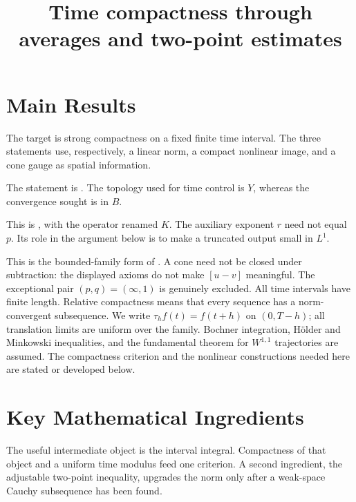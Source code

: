 \documentclass[12pt,reqno]{amsart}
\title{Time compactness through averages and two-point estimates}
\date{}
\begin{document}
\maketitle
\section{Main Results}
The target is strong compactness on a fixed finite time interval. The three statements use, respectively, a linear norm, a compact nonlinear image, and a cone gauge as spatial information.
\begin{theorem}[Simon]\label{thm:simon}

\end{theorem}
The statement is \cite[Theorem 5, pp.~84--85]{S-simon}. The topology used for time control is $Y$, whereas the convergence sought is in $B$.

\begin{theorem}[Maitre]\label{thm:maitre}

\end{theorem}
This is \cite[Theorem 2.1, p.~1726]{S-maitre}, with the operator renamed $K$. The auxiliary exponent $r$ need not equal $p$. Its role in the argument below is to make a truncated output small in $L^1$.

\begin{theorem}\label{thm:cone}

\end{theorem}
This is the bounded-family form of \cite[Theorem 1 and Remark 2, pp.~3--4]{S-barrett-suli}. A cone need not be closed under subtraction: the displayed axioms do not make $[u-v]$ meaningful. The exceptional pair $(p,q)=(\infty,1)$ is genuinely excluded.
All time intervals have finite length. Relative compactness means that every sequence has a norm-convergent subsequence. We write $\tau_h f(t)=f(t+h)$ on $(0,T-h)$; all translation limits are uniform over the family. Bochner integration, H\"older and Minkowski inequalities, and the fundamental theorem for $W^{1,1}$ trajectories are assumed. The compactness criterion and the nonlinear constructions needed here are stated or developed below.
\section{Key Mathematical Ingredients}
The useful intermediate object is the interval integral. Compactness of that object and a uniform time modulus feed one criterion. A second ingredient, the adjustable two-point inequality, upgrades the norm only after a weak-space Cauchy subsequence has been found.
\end{document}
